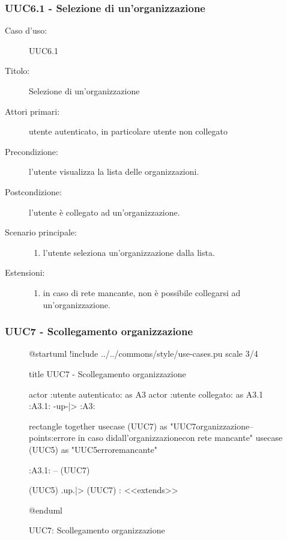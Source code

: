 \documentclass[casi-duso]{subfiles}
\begin{document}
\subsubsection{UUC6.1 - Selezione di un'organizzazione}%
\label{subsub:UUC6.1utente}
\begin{description}
  \item[Caso d’uso:] UUC6.1
  \item[Titolo:] Selezione di un'organizzazione
  \item[Attori primari:] utente autenticato, in particolare utente non collegato
  \item[Precondizione:] l'utente visualizza la lista delle organizzazioni.
  \item[Postcondizione:] l'utente è collegato ad un'organizzazione.
  \item[Scenario principale:]
        \begin{enumerate}
          \item l'utente seleziona un'organizzazione dalla lista.
        \end{enumerate}
  \item[Estensioni:]
        \begin{enumerate}
          \item in caso di rete mancante, non è possibile collegarsi ad un'organizzazione.
        \end{enumerate}
\end{description}

\subsubsection{UUC7 - Scollegamento organizzazione}%
\label{subsub:UUC7utente}

\begin{figure}[h!] 
  \centering 
  \begin{plantuml}
  @startuml
  !include ../../commons/style/use-cases.pu
  scale 3/4

  title UUC7 - Scollegamento organizzazione

  actor :utente autenticato: as A3
  actor :utente collegato: as A3.1
  :A3.1: -up-|> :A3:

  rectangle {
    together {
      usecase (UUC7) as "UUC7\nScollegamento organizzazione\n--\nExtension points:\nVisualizzazione errore in caso di\nscollegamento dall'organizzazione\n con rete mancante"
      usecase (UUC5) as "UUC5\nVisualizzazione errore\nrete mancante"
    }
  }

  :A3.1: -- (UUC7)

  (UUC5) .up.|> (UUC7) : <<extends>>

  @enduml  
    \end{plantuml} 
  \caption{UUC7: Scollegamento organizzazione} 
  \label{fig:uuc7} 
\end{figure}
\end{document}
